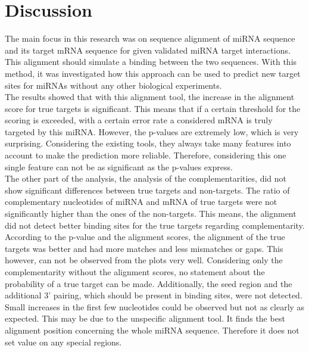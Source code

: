 \documentclass[12pt,  a4paper]{report}
\begin{document}
\chapter{Discussion}
\label{chapter:discussion}

The main focus in this research was on sequence alignment of miRNA sequence and its target mRNA sequence for given validated miRNA target interactions. This alignment should simulate a binding between the two sequences. With this method, it was investigated how this approach can be used to predict new target sites for miRNAs without any other biological experiments.\\

The results showed that with this alignment tool, the increase in the alignment score for true targets is significant. This means that if a certain threshold for the scoring is exceeded, with a certain error rate a considered mRNA is truly targeted by this miRNA. However, the p-values are extremely low, which is very surprising. Considering the existing tools, they always take many features into account to make the prediction more reliable. Therefore, considering this one single feature can not be as significant as the p-values express.\\

The other part of the analysis, the analysis of the complementarities, did not show significant differences between true targets and non-targets. The ratio of complementary nucleotides of miRNA and mRNA of true targets were not significantly higher than the ones of the non-targets. This means, the alignment did not detect better binding sites for the true targets regarding complementarity. According to the p-value and the alignment scores, the alignment of the true targets was better and had more matches and less mismatches or gaps. This however, can not be observed from the plots very well. Considering only the complementarity without the alignment scores, no statement about the probability of a true target can be made. Additionally, the seed region and the additional 3' pairing, which should be present in binding sites, were not detected. Small increases in the first few nucleotides could be observed but not as clearly as expected. This may be due to the unspecific alignment tool. It finds the best alignment position concerning the whole miRNA sequence. Therefore it does not set value on any special regions.  \\
\end{document}
